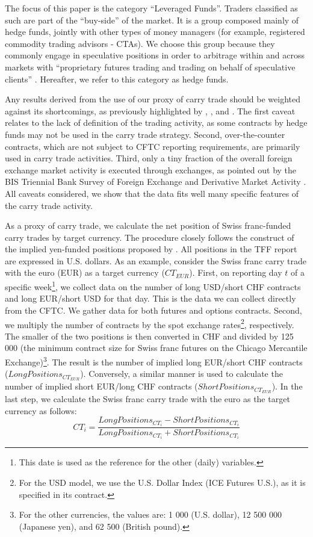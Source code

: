 \documentclass[a4paper, twoside]{templates/ociamthesis}
\begin{document}
The focus of this paper is the category ``Leveraged Funds''. Traders classified as such are part of the ``buy-side'' of the market. It is a group composed mainly of hedge funds, jointly with other types of money managers (for example, registered commodity trading advisors - CTAs). We choose this group because they commonly engage in speculative positions in order to arbitrage within and across markets with ``proprietary futures trading and trading on behalf of speculative clients'' \autocite{commodityfuturestradingcommission2020}. Hereafter, we refer to this category as hedge funds.

Any results derived from the use of our proxy of carry trade should be weighted against its shortcomings, as previously highlighted by \textcite{galati2007}, \textcite{curcuru2011}, and \textcite{bankforinternationalsettlements2015}. The first caveat relates to the lack of definition of the trading activity, as some contracts by hedge funds may not be used in the carry trade strategy. Second, over-the-counter contracts, which are not subject to CFTC reporting requirements, are primarily used in carry trade activities. Third, only a tiny fraction of the overall foreign exchange market activity is executed through exchanges, as pointed out by the BIS Triennial Bank Survey of Foreign Exchange and Derivative Market Activity \autocite{galati2007}. All caveats considered, we show that the data fits well many specific features of the carry trade activity.

As a proxy of carry trade, we calculate the net position of Swiss franc-funded carry trades by target currency. The procedure closely follows the construct of the implied yen-funded positions proposed by \textcite{fong2013}. All positions in the TFF report are expressed in U.S. dollars. As an example, consider the Swiss franc carry trade with the euro (EUR) as a target currency (\(CT_{EUR}\)). First, on reporting day \(t\) of a specific week\footnote{This date is used as the reference for the other (daily) variables.}, we collect data on the number of long USD/short CHF contracts and long EUR/short USD for that day. This is the data we can collect directly from the CFTC. We gather data for both futures and options contracts. Second, we multiply the number of contracts by the spot exchange rates\footnote{For the USD model, we use the U.S. Dollar Index (ICE Futures U.S.), as it is specified in its contract.}, respectively. The smaller of the two positions is then converted in CHF and divided by 125 000 (the minimum contract size for Swiss franc futures on the Chicago Mercantile Exchange)\footnote{For the other currencies, the values are: 1 000 (U.S. dollar), 12 500 000 (Japanese yen), and 62 500 (British pound).}. The result is the number of implied long EUR/short CHF contracts (\(LongPositions_{CT_{EUR}}\)). Conversely, a similar manner is used to calculate the number of implied short EUR/long CHF contracts (\(ShortPositions_{CT_{EUR}}\)). In the last step, we calculate the Swiss franc carry trade with the euro as the target currency as follows:
\begin{equation}
CT_{i} = \frac{LongPositions_{CT_{i}}-ShortPositions_{CT_{i}}}{LongPositions_{CT_{i}}+ShortPositions_{CT_{i}}}
\end{equation}
\end{document}
